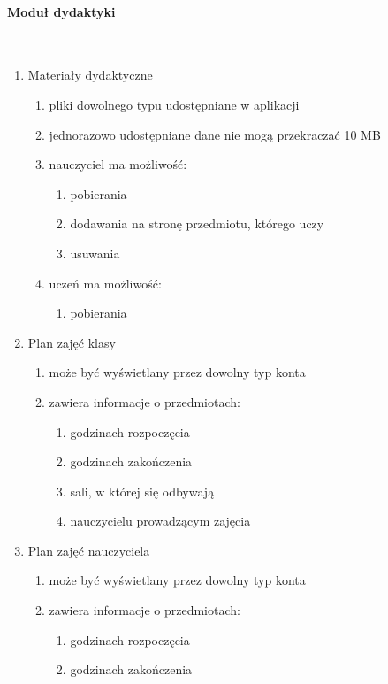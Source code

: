 \documentclass{article}
\begin{document}
\paragraph{Moduł dydaktyki} \mbox{}\\
\begin{enumerate}
\item Materiały dydaktyczne
\begin{enumerate}
  \item pliki dowolnego typu udostępniane w aplikacji
  \item jednorazowo udostępniane dane nie mogą przekraczać 10 MB
  \item nauczyciel ma możliwość:
  \begin{enumerate}
    \item pobierania
    \item dodawania na stronę przedmiotu, którego uczy
    \item usuwania
  \end{enumerate}
  \item uczeń ma możliwość:
  \begin{enumerate}
    \item pobierania
  \end{enumerate}
\end{enumerate}
  \item Plan zajęć klasy  
  \begin{enumerate}
  \item może być wyświetlany przez dowolny typ konta
    \item zawiera informacje o przedmiotach:
    \begin{enumerate}
      \item godzinach rozpoczęcia
      \item godzinach zakończenia
      \item sali, w której się odbywają
      \item nauczycielu prowadzącym zajęcia
    \end{enumerate}
\end{enumerate}
  \item Plan zajęć nauczyciela  
  \begin{enumerate}
  \item może być wyświetlany przez dowolny typ konta
    \item zawiera informacje o przedmiotach:
    \begin{enumerate}
      \item godzinach rozpoczęcia
      \item godzinach zakończenia

\end{enumerate}
\end{enumerate}
\end{enumerate}
\end{document}
